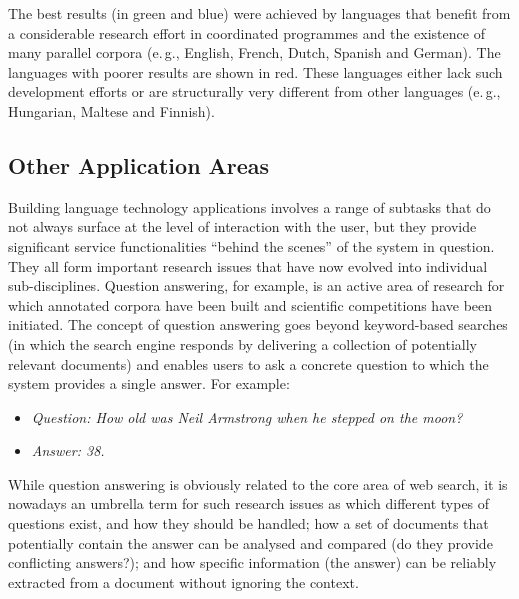 \begin{multicols}{2}
The best results (in green and blue) were achieved by languages that benefit from a considerable research effort in coordinated programmes and the existence of many parallel corpora (e.\,g., English, French, Dutch, Spanish and German). The languages with poorer results are shown in red. These languages either lack such development efforts or are structurally very different from other languages (e.\,g., Hungarian, Maltese and Finnish).

\subsection{Other Application Areas}

Building language technology applications involves a range of subtasks that do not always surface at the level of interaction with the user, but they provide significant service functionalities “behind the scenes” of the system in question. They all form important research issues that have now evolved into individual sub-disciplines. Question answering, for example, is an active area of research for which annotated corpora have been built and scientific competitions have been initiated. The concept of question answering goes beyond keyword-based searches (in which the search engine responds by delivering a collection of potentially relevant documents) and enables users to ask a concrete question to which the system provides a single answer. For example:

\begin{itemize}
\item[] \textit{Question: How old was Neil Armstrong when he stepped on the moon?}
\item[] \textit{Answer: 38.}
\end{itemize}

While question answering is obviously related to the core area of web search, it is nowadays an umbrella term for such research issues as which different types of questions exist, and how they should be handled; how a set of documents that potentially contain the answer can be analysed and compared (do they provide conflicting answers?); and how specific information (the answer) can be reliably extracted from a document without ignoring the context. 



\end{multicols}
